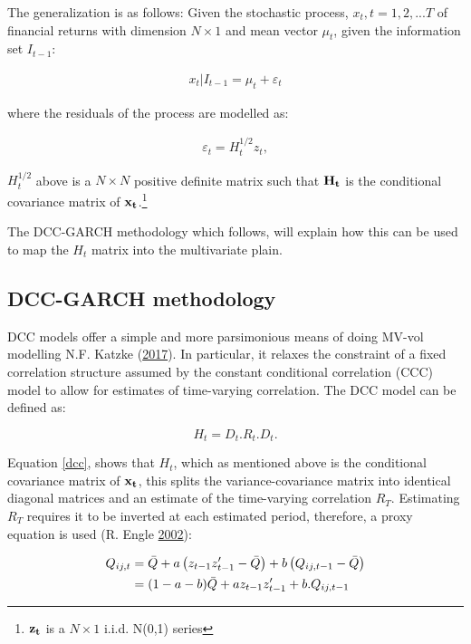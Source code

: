 \documentclass[11pt,preprint, authoryear]{elsarticle}
\numberwithin{equation}{section}
\numberwithin{figure}{section}
\numberwithin{table}{section}
\let\rmarkdownfootnote\footnote%
\def\footnote{\protect\rmarkdownfootnote}
\begin{document}
The generalization is as follows: Given the stochastic process,
\(x_t, t=1,2,...T\) of financial returns with dimension \(N \times 1\)
and mean vector \(\mu_t\), given the information set \(I_{t-1}\):

\begin{align} \label{eq:mgarch1}
x_t \left| I_{t - 1} \right. = \mu_t + \varepsilon_t
\end{align}

where the residuals of the process are modelled as:

\begin{align} \label{eq:mgarch2}
\varepsilon_t = H_{t}^{1/2}z_t, 
\end{align}

\(H_t^{1/2}\) above is a \(N\times N\) positive definite matrix such
that \(\bf{H_t}\) is the conditional covariance matrix of
\(\bf{x_t}\).\footnote{\(\bf{z_t}\) is a \(N\times 1\) i.i.d. N(0,1)
  series}

The DCC-GARCH methodology which follows, will explain how this can be
used to map the \(H_t\) matrix into the multivariate plain.

\subsection{\texorpdfstring{DCC-GARCH methodology
\label{garch}}{DCC-GARCH methodology }}\label{dcc-garch-methodology}

DCC models offer a simple and more parsimonious means of doing MV-vol
modelling N.F. Katzke (\protect\hyperlink{ref-Texevier}{2017}). In
particular, it relaxes the constraint of a fixed correlation structure
assumed by the constant conditional correlation (CCC) model to allow for
estimates of time-varying correlation. The DCC model can be defined as:

\begin{equation} \label{dcc}
H_t = D_t.R_t.D_t.
\end{equation}

Equation \ref{dcc}, shows that \(H_t\), which as mentioned above is the
conditional covariance matrix of \(\bf{x_t}\), this splits the
variance-covariance matrix into identical diagonal matrices and an
estimate of the time-varying correlation \(R_T\). Estimating \(R_T\)
requires it to be inverted at each estimated period, therefore, a proxy
equation is used (R. Engle
\protect\hyperlink{ref-engle2002dynamic}{2002}):

\begin{align}  \label{dcc2}
Q_{ij,t} &= \bar Q + a\left(z_{t - 1}z'_{t - 1} - \bar{Q} \right) + b\left( Q_{ij, t - 1} - \bar{Q} \right) \hfill \\ \notag
                            &= (1 - a - b)\bar{Q} + az_{t - 1}z'_{t - 1} + b.Q_{ij, t - 1} \notag
                            \end{align}
\end{document}
